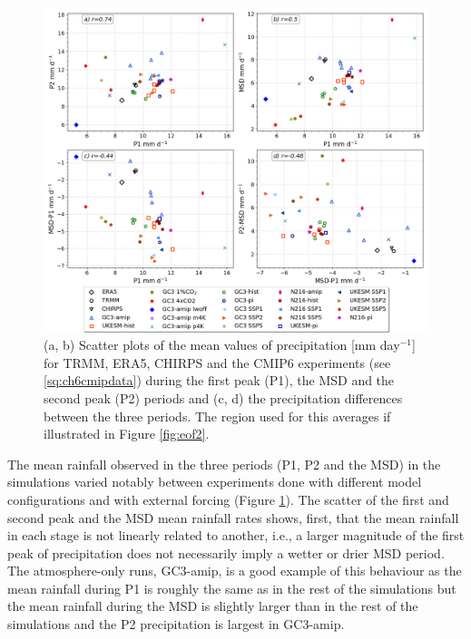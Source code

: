 \label{sq:msdclim}
 \begin{figure}[t!]
\includegraphics[width=\linewidth]{figures/dumscatter_2.png}
\caption[Scatter plot of mean precipitation in different parts of seasonal cycle]{(a, b) Scatter plots of the mean values of precipitation [mm day$^{-1}$] for TRMM, ERA5, CHIRPS and the CMIP6 experiments (see \ref{sq:ch6cmipdata}) during the first peak (P1), the MSD and the second peak (P2) periods and (c, d) the precipitation differences between the three periods. The region used for this averages if illustrated in Figure \ref{fig:eof2}.  
  }
\label{fig:scatter_msd}
\end{figure} 

The mean rainfall observed in the three periods (P1, P2 and the MSD) in the simulations varied notably between experiments done with different model configurations and with external forcing (Figure \ref{fig:scatter_msd}). 
 The scatter of the first and second peak and the MSD mean rainfall rates  shows, first, that the mean rainfall in each stage is not linearly related to another, i.e., a larger magnitude of the first peak of precipitation does not necessarily imply a wetter or drier MSD period. The atmosphere-only runs, GC3-amip, is a good example of this behaviour as the mean rainfall during P1 is roughly the same as in the rest of the simulations but the mean rainfall during the MSD is slightly larger than in the rest of the simulations and the P2 precipitation is largest in GC3-amip. 
 
